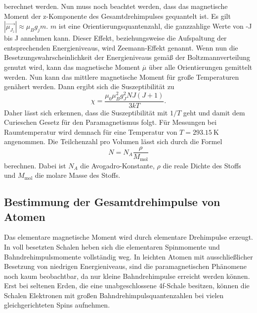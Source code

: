 berechnet werden.
Nun muss noch beachtet werden, dass das magnetische Moment der z-Komponente des Gesamtdrehimpulses gequantelt ist.
Es gilt $\left|\vec{\mu_{J_z}}\right| \approx \mu_B g_j m$. $m$ ist eine Orientierungsquantenzahl, die ganzzahlige Werte von -J bis J
annehmen kann. Dieser Effekt, beziehungsweise die Aufspaltung der entsprechenden Energieniveaus, wird Zeemann-Effekt genannt.
Wenn nun die Besetzungswahrscheinlichkeit der Energieniveaus gemäß der Boltzmannverteilung genutzt wird, kann das magnetische Moment $\overline{\mu}$ über
alle Orientierungen gemittelt werden. Nun kann das mittlere magnetische Moment für
große Temperaturen genähert werden. Dann ergibt sich die Suszeptibilität zu 
\begin{equation}
    \chi= \frac{\mu_0\mu_B^2g_J^2NJ(J+1)}{3kT}.
    \label{eq:chi}
\end{equation}
Daher lässt sich erkennen, dass die Suszeptibilität mit $1/T$ geht und damit dem Curieschen Gesetz für den Paramagnetismus folgt.
Für Messungen bei Raumtemperatur wird demnach für eine Temperatur von $T=\qty{293.15}{\kelvin}$ angenommen.
Die Teilchenzahl pro Volumen lässt sich durch die Formel
\begin{equation}
    N=N_A\frac{\rho}{M_\text{mol}}
    \label{eq:N}
\end{equation}
berechnen. Dabei ist $N_A$ die Avogadro-Konstante, $\rho$ die reale Dichte des Stoffs und $M_\text{mol}$ die molare Masse des Stoffs.
\subsection{Bestimmung der Gesamtdrehimpulse von Atomen }
Das elementare magnetische Moment wird durch elementare Drehimpulse erzeugt. In 
voll besetzten Schalen heben sich die elementaren Spinmomente und Bahndrehimpulsmomente vollständig weg.
In leichten Atomen mit ausschließlicher Besetzung von niedrigen Energieniveaus, sind die paramagnetischen
Phänomene noch kaum beobachtbar, da nur kleine Bahndrehimpulse erreicht werden können.
Erst bei seltenen Erden, die eine unabgeschlossene 4f-Schale besitzen, können die Schalen Elektronen mit
großen Bahndrehimpulsquantenzahlen bei vielen gleichgerichteten Spins aufnehmen.

